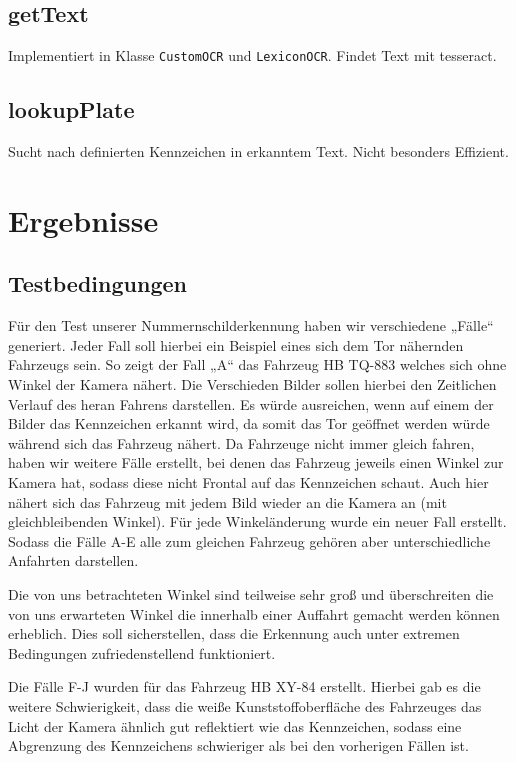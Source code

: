 \documentclass{../Vorlage/sebDenCls}
\begin{document}
\subsection{getText}
Implementiert in Klasse \texttt{CustomOCR} und \texttt{LexiconOCR}.
Findet Text mit tesseract.


\subsection{lookupPlate}
\label{lookupPlate}
Sucht nach definierten Kennzeichen in erkanntem Text. Nicht besonders Effizient.


\section{Ergebnisse}
\subsection{Testbedingungen}
Für den Test unserer Nummernschilderkennung haben wir verschiedene „Fälle“ generiert. Jeder Fall soll hierbei ein Beispiel eines sich dem Tor nähernden Fahrzeugs sein. So zeigt der Fall „A“ das Fahrzeug HB TQ-883 welches sich ohne Winkel der Kamera nähert. Die Verschieden Bilder sollen hierbei den Zeitlichen Verlauf des heran Fahrens darstellen. Es würde ausreichen, wenn auf einem der Bilder das Kennzeichen erkannt wird, da somit das Tor geöffnet werden würde während sich das Fahrzeug nähert. Da Fahrzeuge nicht immer gleich fahren, haben wir weitere Fälle erstellt, bei denen das Fahrzeug jeweils einen Winkel zur Kamera hat, sodass diese nicht Frontal auf das Kennzeichen schaut. Auch hier nähert sich das Fahrzeug mit jedem Bild wieder an die Kamera an (mit gleichbleibenden Winkel). Für jede Winkeländerung wurde ein neuer Fall erstellt.
Sodass die Fälle A-E alle zum gleichen Fahrzeug gehören aber unterschiedliche Anfahrten darstellen.

Die von uns betrachteten Winkel sind teilweise sehr groß und überschreiten die von uns erwarteten Winkel die innerhalb einer Auffahrt gemacht werden können erheblich. Dies soll sicherstellen, dass die Erkennung auch unter extremen Bedingungen zufriedenstellend funktioniert.

Die Fälle F-J wurden für das Fahrzeug HB XY-84 erstellt. Hierbei gab es die weitere Schwierigkeit, dass die weiße Kunststoffoberfläche des Fahrzeuges das Licht der Kamera ähnlich gut reflektiert wie das Kennzeichen, sodass eine Abgrenzung des Kennzeichens schwieriger als bei den vorherigen Fällen ist.
\end{document}
